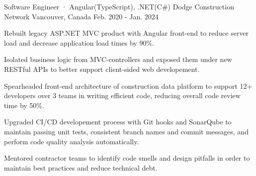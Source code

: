 

\begin{cventries}

\cventry
  {Software Engineer · Angular(TypeScript), .NET(C\#)} %
  {Dodge Construction Network} %
  {Vancouver, Canada} %
  {Feb. 2020 - Jan. 2024} %
  {
    \begin{cvitems} %
      \item {Rebuilt legacy ASP.NET MVC product with Angular front-end to reduce server load and decrease application load times by 90\%.}
      \item {Isolated business logic from MVC-controllers and exposed them under new RESTful APIs to better support client-sided web developement.}
      \item {Spearheaded front-end architecture of construction data platform to support 12+ developers over 3 teams in writing efficient code, reducing overall code review time by 50\%.}
      \item {Upgraded CI/CD developement process with Git hooks and SonarQube to maintain passing unit tests, consistent branch names and commit messages, and perform code quality analysis automatically.}
      \item {Mentored contractor teams to identify code smells and design pitfalls in order to maintain best practices and reduce technical debt.}
    \end{cvitems}
  }


\end{cventries}
